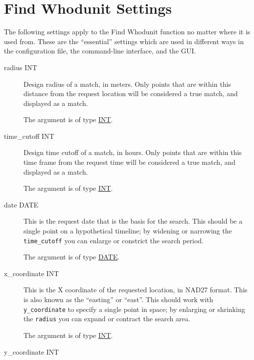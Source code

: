 \section{Find Whodunit Settings}
\hypertarget{whodunit-settings}{}

The following settings apply to the Find Whodunit function no matter
where it is used from. These are the ``essential'' settings which are
used in different ways in the configuration file, the command-line
interface, and the GUI.

\begin{description}

\item[radius INT]
\hypertarget{whodunit-radius}{}

Design radius of a match, in meters. Only points that are within this
distance from the request location will be considered a true match,
and displayed as a match.

The argument is of type \hyperlink{argument-type-int}{INT}.

\item[time\_cutoff INT]
\hypertarget{whodunit-time-cutoff}{}

Design time cutoff of a match, in hours. Only points that are within
this time frame from the request time will be considered a true
match, and displayed as a match.

The argument is of type \hyperlink{argument-type-int}{INT}.

\item[date DATE]
\hypertarget{whodunit-date}{}

This is the request date that is the basis for the search. This should
be a single point on a hypothetical timeline; by widening or narrowing
the \texttt{time\_cutoff} you can enlarge or constrict the search period.

The argument is of type \hyperlink{argument-type-date}{DATE}.

\item[x\_coordinate INT]
\hypertarget{whodunit-x-coordinate}{}

This is the X coordinate of the requested location, in NAD27 format.
This is also known as the ``easting'' or ``east''. This should work
with \texttt{y\_coordinate} to specify a single point in space; by
enlarging or shrinking the \texttt{radius} you can expand or contract
the search area.

The argument is of type \hyperlink{argument-type-int}{INT}.

\item[y\_coordinate INT]
\hypertarget{whodunit-y-coordinate}{}


\end{description}

